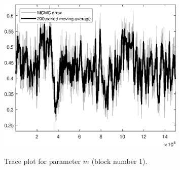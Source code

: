\begin{figure}[H]
\centering
  \includegraphics[width=0.8\textwidth]{BRS_gen/graphs/TracePlot_m_blck_1}\\
    \caption{Trace plot for parameter ${m}$ (block number 1).}
\end{figure}
